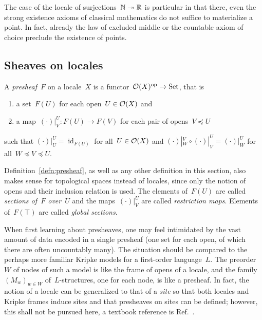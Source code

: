 \documentclass{ws-rv9x6}
\begin{document}
{\begin{remark}The case of the locale of surjections~$\mathbb{N} \twoheadrightarrow
\mathbb{R}$ is particular in that there, even the strong existence axioms of
classical mathematics do not suffice to materialize a point. In fact, already
the law of excluded middle or the countable axiom of choice preclude the
existence of points.
\end{remark}


\subsection{Sheaves on locales}
\label{sect:sheaves}

\begin{definition}\label{defn:presheaf}
A \emph{presheaf}~$F$ on a locale~$X$ is a functor~$\mathcal{O}(X)^{\mathrm{op}} \to \mathrm{Set}$, that is
\begin{enumerate}
  \item a set~$F(U)$ for each open~$U \in \mathcal{O}(X)$ and
  \item a map~$(\cdot)|^U_V : F(U) \to F(V)$ for each pair of opens~$V \preceq U$
\end{enumerate}
such that $(\cdot)|^U_U = \operatorname{id}_{F(U)}$ for all~$U \in \mathcal{O}(X)$ and
$(\cdot)|^V_W \circ (\cdot)|^U_V = (\cdot)|^U_W$ for all~$W \preceq V
\preceq U$.\end{definition}

Definition~\ref{defn:presheaf}, as well as any other definition in this section,
also makes sense for topological spaces instead of locales, since only the
notion of opens and their inclusion relation is used. The elements of~$F(U)$ are
called \emph{sections of~$F$ over~$U$} and the maps~$(\cdot)|^U_V$
are called \emph{restriction maps}. Elements of~$F(\top)$ are called
\emph{global sections}.

When first learning about presheaves, one may feel intimidated by the vast
amount of data encoded in a single presheaf (one set for each open, of which there are often uncountably many). The
situation should be compared to the perhaps more familiar Kripke models for a first-order language~$L$. The
preorder~$W$ of nodes of such a model is like the frame of opens of a locale, and the
family~$(M_w)_{w \in W}$ of~$L$-structures, one for each node, is like a
presheaf. In fact, the notion of a locale can be generalized to that of a
\emph{site} so that both locales and Kripke frames induce sites and that
presheaves on sites can be defined; however, this shall not be pursued here,
a textbook reference is Ref.~.

}
\end{document}
